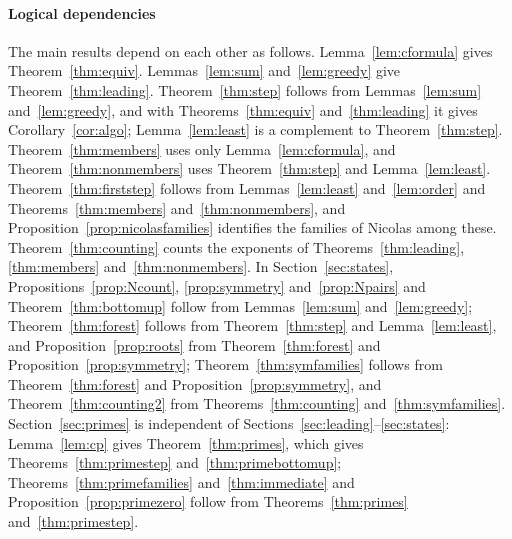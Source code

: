 \documentclass[11pt]{amsart}
\theoremstyle{definition}
\begin{document}
\paragraph{Logical dependencies} The main results depend on each other as follows. Lemma~\ref{lem:cformula} gives Theorem~\ref{thm:equiv}. Lemmas~\ref{lem:sum} and~\ref{lem:greedy} give Theorem~\ref{thm:leading}. Theorem~\ref{thm:step} follows from Lemmas~\ref{lem:sum} and~\ref{lem:greedy}, and with Theorems~\ref{thm:equiv} and~\ref{thm:leading} it gives Corollary~\ref{cor:algo}; Lemma~\ref{lem:least} is a complement to Theorem~\ref{thm:step}. Theorem~\ref{thm:members} uses only Lemma~\ref{lem:cformula}, and Theorem~\ref{thm:nonmembers} uses Theorem~\ref{thm:step} and Lemma~\ref{lem:least}. Theorem~\ref{thm:firststep} follows from Lemmas~\ref{lem:least} and~\ref{lem:order} and Theorems~\ref{thm:members} and~\ref{thm:nonmembers}, and Proposition~\ref{prop:nicolasfamilies} identifies the families of Nicolas among these. Theorem~\ref{thm:counting} counts the exponents of Theorems~\ref{thm:leading}, \ref{thm:members} and~\ref{thm:nonmembers}. In Section~\ref{sec:states}, Propositions~\ref{prop:Ncount}, \ref{prop:symmetry} and~\ref{prop:Npairs} and Theorem~\ref{thm:bottomup} follow from Lemmas~\ref{lem:sum} and~\ref{lem:greedy}; Theorem~\ref{thm:forest} follows from Theorem~\ref{thm:step} and Lemma~\ref{lem:least}, and Proposition~\ref{prop:roots} from Theorem~\ref{thm:forest} and Proposition~\ref{prop:symmetry}; Theorem~\ref{thm:symfamilies} follows from Theorem~\ref{thm:forest} and Proposition~\ref{prop:symmetry}, and Theorem~\ref{thm:counting2} from Theorems~\ref{thm:counting} and~\ref{thm:symfamilies}. Section~\ref{sec:primes} is independent of Sections~\ref{sec:leading}--\ref{sec:states}: Lemma~\ref{lem:cp} gives Theorem~\ref{thm:primes}, which gives Theorems~\ref{thm:primestep} and~\ref{thm:primebottomup}; Theorems~\ref{thm:primefamilies} and~\ref{thm:immediate} and Proposition~\ref{prop:primezero} follow from Theorems~\ref{thm:primes} and~\ref{thm:primestep}.
\end{document}
